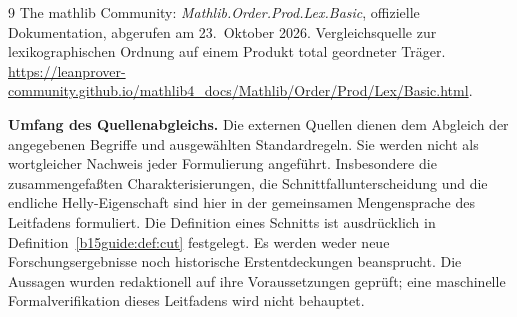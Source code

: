 \begin{thebibliography}{9}
The mathlib Community: \emph{Mathlib.Order.Prod.Lex.Basic},
offizielle Dokumentation, abgerufen am 23.~Oktober 2026.
Vergleichsquelle zur lexikographischen Ordnung auf einem
Produkt total geordneter Träger.
\url{https://leanprover-community.github.io/mathlib4_docs/Mathlib/Order/Prod/Lex/Basic.html}.

\end{thebibliography}

\begingroup
\footnotesize
\noindent\textbf{Umfang des Quellenabgleichs.}
Die externen Quellen dienen dem Abgleich der angegebenen Begriffe
und ausgewählten Standardregeln. Sie werden nicht als wortgleicher
Nachweis jeder Formulierung angeführt.
Insbesondere die zusammengefaßten Charakterisierungen, die
Schnittfallunterscheidung und die endliche Helly-Eigenschaft sind
hier in der gemeinsamen Mengensprache des Leitfadens formuliert.
Die Definition eines Schnitts ist ausdrücklich in
Definition~\ref{b15guide:def:cut} festgelegt.
Es werden weder neue Forschungsergebnisse noch historische
Erstentdeckungen beansprucht. Die Aussagen wurden redaktionell
auf ihre Voraussetzungen geprüft; eine maschinelle
Formalverifikation dieses Leitfadens wird nicht behauptet.
\endgroup
